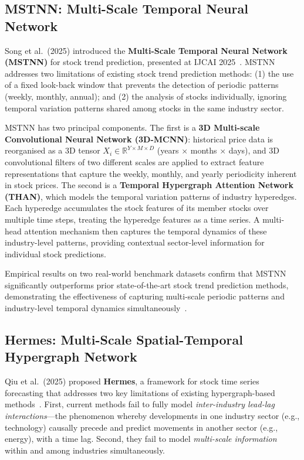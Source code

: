 \documentclass[a4paper,11pt]{report}
\begin{document}
\subsection{MSTNN: Multi-Scale Temporal Neural Network}

Song et al.\ (2025) introduced the \textbf{Multi-Scale Temporal Neural Network (MSTNN)} for stock trend prediction, presented at IJCAI 2025~\cite{song2025mstnn}. MSTNN addresses two limitations of existing stock trend prediction methods: (1) the use of a fixed look-back window that prevents the detection of periodic patterns (weekly, monthly, annual); and (2) the analysis of stocks individually, ignoring temporal variation patterns shared among stocks in the same industry sector.

MSTNN has two principal components. The first is a \textbf{3D Multi-scale Convolutional Neural Network (3D-MCNN)}: historical price data is reorganised as a 3D tensor $X_i \in \mathbb{R}^{Y \times M \times D}$ (years $\times$ months $\times$ days), and 3D convolutional filters of two different scales are applied to extract feature representations that capture the weekly, monthly, and yearly periodicity inherent in stock prices. The second is a \textbf{Temporal Hypergraph Attention Network (THAN)}, which models the temporal variation patterns of industry hyperedges. Each hyperedge accumulates the stock features of its member stocks over multiple time steps, treating the hyperedge features as a time series. A multi-head attention mechanism then captures the temporal dynamics of these industry-level patterns, providing contextual sector-level information for individual stock predictions.

Empirical results on two real-world benchmark datasets confirm that MSTNN significantly outperforms prior state-of-the-art stock trend prediction methods, demonstrating the effectiveness of capturing multi-scale periodic patterns and industry-level temporal dynamics simultaneously~\cite{song2025mstnn}.

\subsection{Hermes: Multi-Scale Spatial-Temporal Hypergraph Network}

Qiu et al.\ (2025) proposed \textbf{Hermes}, a framework for stock time series forecasting that addresses two key limitations of existing hypergraph-based methods~\cite{qiu2025hermes}. First, current methods fail to fully model \emph{inter-industry lead-lag interactions}---the phenomenon whereby developments in one industry sector (e.g., technology) causally precede and predict movements in another sector (e.g., energy), with a time lag. Second, they fail to model \emph{multi-scale information} within and among industries simultaneously.
\end{document}
